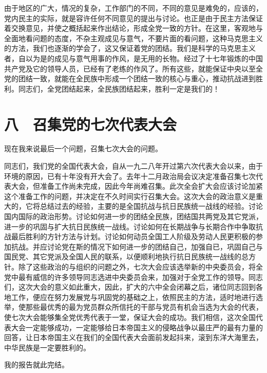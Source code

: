 由于地区的广大，情况的复杂，工作部门的不同，不同的意见是难免的，应该的，党内民主的实际，就是容许任何不同意见的提出与讨论。也正是由于民主方法保证着交换意见，并使之概括起来作出结论，形成全党一致的方针。在这里，客观地与全面地看问题的态度，不杂主观成见与意气，不要片面的看问题，这种马克思主义的方法，我们也逐渐的学会了，这又保证着党的团结。我们是科学的马克思主义者，自以为是的成见与意气用事的作风，是无用的长物。经过了十七年锻炼的中国共产党及它的领导人员，已经有了老练的作风了。所有这些，就能保证中央以至全党的团结一致，就能在全民族中形成一个团结一致的核心与重心，推动抗战进到胜利。同志们，全党团结起来，全民族团结起来，胜利一定是我们的！

\section{八　召集党的七次代表大会}

现在我来说最后一个问题，召集七次大会的问题。

同志们，我们党的全国代表大会，自从一九二八年开过第六次代表大会以来，由于环境的原因，已有十年没有开大会了。去年十二月政治局会议决定准备召集七次代表大会，但准备工作尚未完成，因此今年尚难召集。此次全会扩大会应该讨论加紧这个准备工作的问题，并决定在不久时间实行召集大会。这次大会的政治意义是重大的，它将总结过去的经验，主要的是全国抗战与抗日民族统一战线的经验。讨论国内国际的政治形势。讨论如何进一步的团结全民族，团结国共两党及其它党派，进一步的巩固与扩大抗日民族统一战线。讨论如何在长期战争与长期合作中争取抗战最后胜利的方针方法与计划。讨论如何动员全国工人阶级及劳动人民更积极的参加抗战。并应讨论党在斯的情况下如何进一步的团结自己，加强自已，巩固自己与国民党、其它党派及全国人民的联系，以便顺利地执行抗日民族统一战线的总方针。除了这些政治的与组织的问题之外，七次大会应该选举新的中央委员会，将全党中最有威信的许多领导同志选进中央委员会来，加强对于全党工作的领导。同志们，这次大会的意义如此重大，因此，扩大的六中全会闭幕之后，诸位同志回到各地工作，便应在努力发展党与巩固党的基础之上，依照民主的方法，适时地进行选举，使那些最优秀的最为党员群众所信托的干部与党员有机会当选为大会的代表，使七次大会能够集全党优秀代表于一堂，保证大会的成功。我们相信，这次全国代表大会一定能够成功，一定能够给日本帝国主义的侵略战争以最庄严的最有力量的回答，让日本帝国主义在我们的全国代表大会面前发起抖来，滚到东洋大海里去，中华民族是一定要胜利的。

我的报告就此完结。
